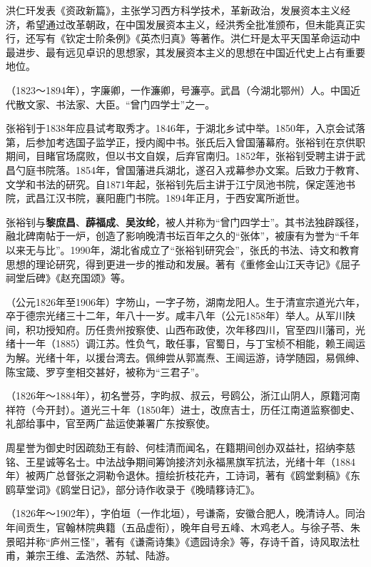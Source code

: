 \begin{description}
        洪仁玕发表《资政新篇》，主张学习西方科学技术，革新政治，发展资本主义经济，希望通过改革朝政，在中国发展资本主义，经洪秀全批准颁布，但未能真正实行，还写有《钦定士阶条例》《英杰归真》等著作。洪仁玕是太平天国革命运动中最进步、最有远见卓识的思想家，其发展资本主义的思想在中国近代史上占有重要地位。
  \item[张裕钊] （1823～1894年），字廉卿，一作濂卿，号濂亭。武昌（今湖北鄂州）人。中国近代散文家、书法家、大臣。“曾门四学士”之一。\par
        张裕钊于1838年应县试考取秀才。1846年，于湖北乡试中举。1850年，入京会试落第，后参加考选国子监学正，授内阁中书。张氏后入曾国藩幕府。张裕钊在京供职期间，目睹官场腐败，但以书文自娱，后弃官南归。1852年，张裕钊受聘主讲于武昌勺庭书院落。1854年，曾国藩进兵湖北，遂召入戎幕参办文案。后致力于教育、文学和书法的研究。自1871年起，张裕钊先后主讲于江宁凤池书院，保定莲池书院，武昌江汉书院，襄阳鹿门书院。1894年正月，于西安寓所逝世。\par
        张裕钊与\textbf{黎庶昌}、\textbf{薜福成}、\textbf{吴汝纶}，被人并称为“曾门四学士”。其书法独辟蹊径，融北碑南帖于一炉，创造了影响晚清书坛百年之久的“张体”，被康有为誉为“千年以来无与比”。1990年，湖北省成立了“张裕钊研究会”，张氏的书法、诗文和教育思想的理论研究，得到更进一步的推动和发展。著有《重修金山江天寺记》《屈子祠堂后碑》《赵充国颂》等。
  \item[易佩绅] （公元1826年至1906年）字笏山，一字子笏，湖南龙阳人。生于清宣宗道光六年，卒于德宗光绪三十二年，年八十一岁。咸丰八年（公元1858年）举人。从军川陕间，积功授知府。历任贵州按察使、山西布政使，次年移四川，官至四川藩司，光绪十一年（1885）调江苏。性负气，敢任事，官蜀日，与丁宝桢不相能，赖王闿运为解。光绪十年，以援台湾去。佩绅尝从郭嵩焘、王闿运游，诗学随园，易佩绅、陈宝箴、罗亨奎相交甚好，被称为“三君子”。
  \item[周星誉] （1826年～1884年），初名誉芬，字昀叔、叔云，号鸥公，浙江山阴人，原籍河南祥符（今开封）。道光三十年（1850年）进士，改庶吉士，历任江南道监察御史、礼部给事中，官至两广盐运使兼署广东按察使。\par
        周星誉为御史时因疏劾王有龄、何桂清而闻名，在籍期间创办双益社，招纳李慈铭、王星诚等名士。中法战争期间筹饷接济刘永福黑旗军抗法，光绪十年（1884年）被两广总督张之洞勒令退休。擅绘折枝花卉，工诗词，著有《鸥堂剩稿》《东鸥草堂词》《鸥堂日记》，部分诗作收录于《晚晴簃诗汇》。
  \item[王尚辰] （1826年～1902年），字伯垣（一作北垣），号谦斋，安徽合肥人，晚清诗人。同治年间贡生，官翰林院典籍（五品虚衔），晚年自号五峰、木鸡老人。与徐子苓、朱景昭并称“庐州三怪”，著有《谦斋诗集》《遗园诗余》等，存诗千首，诗风取法杜甫，兼宗王维、孟浩然、苏轼、陆游。\par

\end{description}
